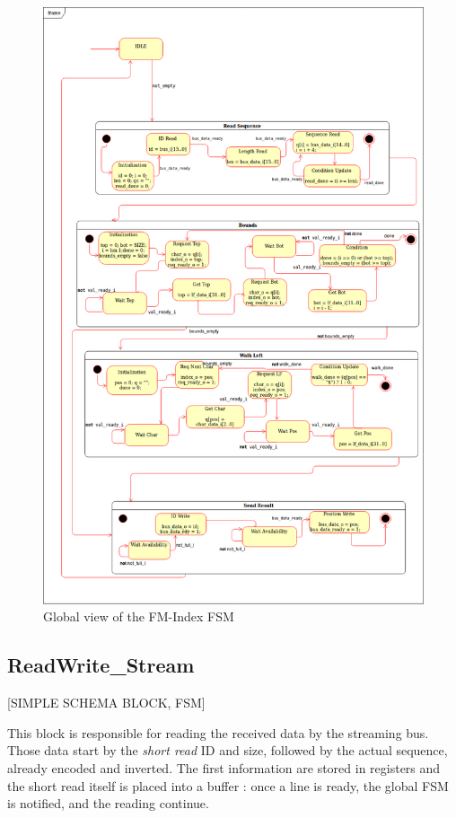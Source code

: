 \begin{figure}[H]
 \includegraphics[scale = 0.4]{Figures/MSS.png}
    \caption{Global view of the FM-Index FSM}
    \label{fig:fsm}
\end{figure}

\subsection{ReadWrite\_Stream}

[SIMPLE SCHEMA BLOCK, FSM]

This block is responsible for reading the received data by the streaming bus. Those data start by the \textsl{short read} ID and size, followed by the actual sequence, already encoded and inverted. The first information are stored in registers and the short read itself is placed into a buffer : once a line is ready, the global FSM is notified, and the reading continue.

